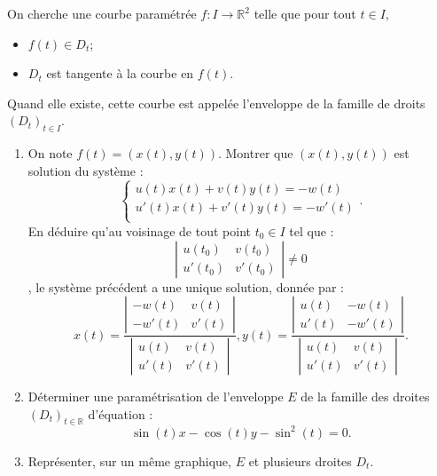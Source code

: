 \documentclass[10pt,fleqn]{article} %
\begin{document}
\begin{multicols}{2}
On cherche une courbe paramétrée $f:I \to \mathbb{R}^2$ telle que pour tout $t\in I$, 
\begin{itemize}
\item $f(t)\in D_t$;
\item $D_t$ est tangente à la courbe en $f(t)$.
\end{itemize}
Quand elle existe, cette courbe est appelée l'enveloppe de la famille de droits $\left(D_t\right)_{t\in I}$. 
\begin{enumerate}
\item On note $f(t)=\left(x(t),y(t)\right)$. Montrer que $\left(x(t),y(t)\right)$ est solution du système :
$$
\left\{
\begin{array}{l}
u(t) x(t) + v(t) y(t)= -w(t) \\
u'(t) x(t) + v'(t) y(t)= -w'(t) \\
\end{array}
\right. .
$$
En déduire qu'au voisinage de tout point $t_0 \in I$ tel que :
$$
\left| 
\begin{array}{cc}
u(t_0) & v(t_0) \\
u'(t_0) & v'(t_0)
\end{array}
\right|
\neq 0
$$,
le système précédent a une unique solution, donnée par :
$$
x(t)=\dfrac{\left| 
\begin{array}{cc}
-w(t) & v(t) \\
-w'(t) & v'(t)
\end{array}
\right|
}{\left| 
\begin{array}{cc}
u(t) & v(t) \\
u'(t) & v'(t)
\end{array}
\right|},
y(t)=\dfrac{\left| 
\begin{array}{cc}
u(t) & -w(t) \\
u'(t) & -w'(t)
\end{array}
\right|
}{\left| 
\begin{array}{cc}
u(t) & v(t) \\
u'(t) & v'(t)
\end{array}
\right|}.
$$
\item Déterminer une paramétrisation de l'enveloppe $E$ de la famille des droites $\left(D_t\right)_{t\in \mathbb{R}}$ d'équation :
$$
\sin(t) x - \cos(t) y -\sin^2(t)=0.
$$
\item Représenter, sur un même graphique, $E$ et plusieurs droites $D_t$.
\end{enumerate}




\end{multicols}
\end{document}
